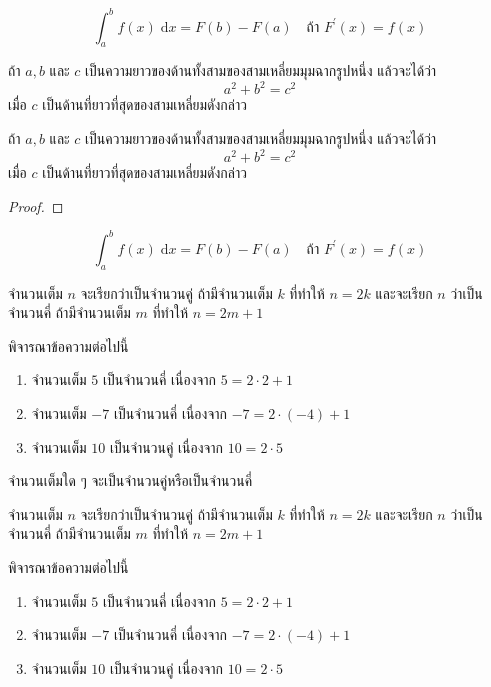 \begin{content}
\begin{equation}
	\int_{a}^{b} f(x) \;\mathrm{d}x = F(b) - F(a) \quad\text{ถ้า }F^\prime(x) = f(x)
\end{equation}
\begin{theorem}[พีธาโกรัส]
ถ้า $a,b$ และ $c$ เป็นความยาวของด้านทั้งสามของสามเหลี่ยมมุมฉากรูปหนึ่ง แล้วจะได้ว่า $$a^2+b^2 = c^2$$ เมื่อ $c$ เป็นด้านที่ยาวที่สุดของสามเหลี่ยมดังกล่าว
\end{theorem}
\begin{theorem}
ถ้า $a,b$ และ $c$ เป็นความยาวของด้านทั้งสามของสามเหลี่ยมมุมฉากรูปหนึ่ง แล้วจะได้ว่า $$a^2+b^2 = c^2$$ เมื่อ $c$ เป็นด้านที่ยาวที่สุดของสามเหลี่ยมดังกล่าว
\end{theorem}
\begin{proof}
\end{proof}
\begin{equation}
	\int_{a}^{b} f(x) \;\mathrm{d}x = F(b) - F(a) \quad\text{ถ้า }F^\prime(x) = f(x)
\end{equation}
\begin{definition}
จำนวนเต็ม $n$ จะเรียกว่าเป็นจำนวนคู่ ถ้ามีจำนวนเต็ม $k$ ที่ทำให้ $n = 2k$	 และจะเรียก $n$ ว่าเป็นจำนวนคี่ ถ้ามีจำนวนเต็ม $m$ ที่ทำให้ $n = 2m + 1$
\end{definition}
\begin{example}
พิจารณาข้อความต่อไปนี้
\begin{enumerate}
	\item จำนวนเต็ม $5$ เป็นจำนวนคี่ เนื่องจาก $5 = 2\cdot 2 + 1$
	\item จำนวนเต็ม $-7$ เป็นจำนวนคี่ เนื่องจาก $-7 = 2\cdot (-4) + 1$
	\item จำนวนเต็ม $10$ เป็นจำนวนคู่ เนื่องจาก $10 = 2\cdot 5$
\end{enumerate}	
\end{example}
\begin{theorem}
จำนวนเต็มใด ๆ จะเป็นจำนวนคู่หรือเป็นจำนวนคี่	
\end{theorem}
\begin{definition}[จำนวนคู่/คี่]
จำนวนเต็ม $n$ จะเรียกว่าเป็นจำนวนคู่ ถ้ามีจำนวนเต็ม $k$ ที่ทำให้ $n = 2k$	 และจะเรียก $n$ ว่าเป็นจำนวนคี่ ถ้ามีจำนวนเต็ม $m$ ที่ทำให้ $n = 2m + 1$
\end{definition}
\begin{example}
พิจารณาข้อความต่อไปนี้
\begin{enumerate}
	\item จำนวนเต็ม $5$ เป็นจำนวนคี่ เนื่องจาก $5 = 2\cdot 2 + 1$
	\item จำนวนเต็ม $-7$ เป็นจำนวนคี่ เนื่องจาก $-7 = 2\cdot (-4) + 1$
	\item จำนวนเต็ม $10$ เป็นจำนวนคู่ เนื่องจาก $10 = 2\cdot 5$
\end{enumerate}	
\end{example}


\end{content}
